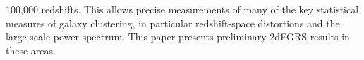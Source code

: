 {{{{{{{{{{{{{{%

100,000 redshifts. This allows precise measurements of many of the key
statistical measures of galaxy clustering, in particular
redshift-space distortions and the large-scale power spectrum.  This
paper presents preliminary 2dFGRS results in these areas.

}}}}}}}}}}}}}}

